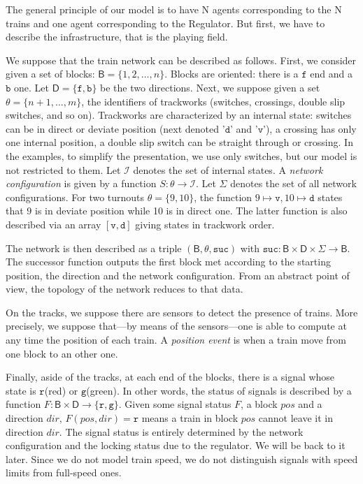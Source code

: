 \documentclass[runningheads]{llncs}
\newcommand{\directions}{{\mathsf{D}}}
\newcommand{\turnouts}{{\mathsf{\theta}}}
\newcommand{\blocks}{{\mathsf{B}}}
\newcommand{\internalState}{{\mathcal{I}}}
\newcommand{\forward}{{\mathtt{f}}}
\newcommand{\backward}{{\mathtt{b}}}
\newcommand{\sucblock}{{\mathtt{suc}}}
\newcommand{\sigred}{{\mbox{$\mathtt{r}$}}\xspace}
\newcommand{\siggreen}{{\mbox{$\mathtt{g}$}}\xspace}
\newcommand{\deviate}{{\mbox{$\mathtt{v}$}}\xspace}
\newcommand{\direct}{{\mbox{$\mathtt{d}$}}\xspace}
\begin{document}
The general principle of our model is to have N agents corresponding to the N trains and one agent corresponding to the Regulator. But first, we have to describe the infrastructure, that is  the playing field. 

We suppose that the train network can be described as follows. First, we consider given a set of blocks: $\blocks = \{ 1, 2, \ldots, n\}$. Blocks are oriented: there is a $\forward$ end and a $\backward$ one. Let $\directions = \{\forward, \backward\}$ be the two directions.  Next, we suppose given a set $\turnouts = \{ n+1, \ldots, m\}$, the identifiers  of trackworks (switches, crossings, double slip switches, and so on). Trackworks are characterized by an internal state: switches can be in direct or deviate position (next denoted '\direct' and '\deviate'),  a crossing has only one internal position, a double slip switch can be straight through or crossing. In the examples, to simplify the presentation, we use only switches, but our model is not restricted to them.  Let $\internalState$ denotes the set of internal states. A \emph{network configuration} is given by a function $S: \turnouts \to \internalState$. Let $\Sigma$ denotes the set of all network configurations. For two turnouts $\theta = \{9, 10\}$, the function $9 \mapsto \deviate, 10 \mapsto \direct$ states that $9$ is in deviate position while 10 is in direct one. The latter function is also described via an array  $[\deviate, \direct]$ giving states in trackwork order. 

The network is then described as a triple $(\blocks, \turnouts, \sucblock)$ with $\sucblock: \blocks \times \directions \times \Sigma \to \blocks$. The successor function outputs the first block met according to the starting position, the direction and the network configuration.  From an abstract point of view, the topology of the network reduces to that data.  

On the tracks, we suppose there are sensors to detect the presence of trains. More precisely, we suppose that---by means of the sensors---one is able to compute at any time the position of each train. A \emph{position event} is when a train move from one block to an other one. 

Finally, aside of the tracks, at each end of the blocks, there is a signal whose state is \sigred (red) or \siggreen (green). In other words, the status of signals is described by a function $F: \blocks \times \directions \to \{ \sigred, \siggreen\}$. Given some signal status $F$, a block $pos$ and a direction $dir$, $F(pos,dir) = \sigred$ means a train in block $pos$ cannot leave it in direction $dir$. The signal status is entirely determined by the network configuration and the locking status due to the regulator. We will be back to it later.  Since we do not model train speed, we do not distinguish signals with speed limits from full-speed ones. 
\end{document}
